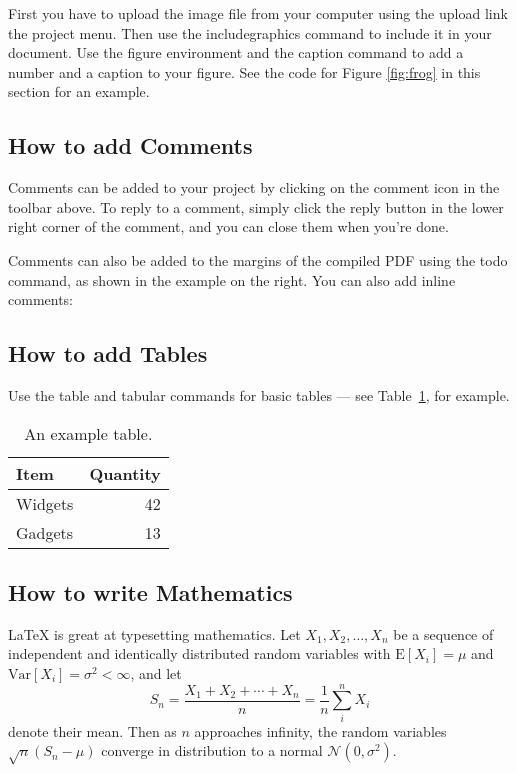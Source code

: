 First you have to upload the image file from your computer using the upload link the project menu. Then use the includegraphics command to include it in your document. Use the figure environment and the caption command to add a number and a caption to your figure. See the code for Figure \ref{fig:frog} in this section for an example.

\subsection{How to add Comments}

Comments can be added to your project by clicking on the comment icon in the toolbar above. %
%
%
To reply to a comment, simply click the reply button in the lower right corner of the comment, and you can close them when you're done.

Comments can also be added to the margins of the compiled PDF using the todo command, as shown in the example on the right. You can also add inline comments:


\subsection{How to add Tables}

Use the table and tabular commands for basic tables --- see Table~\ref{tab:widgets}, for example. 

\begin{table}
\centering
\begin{tabular}{l|r}
Item & Quantity \\\hline
Widgets & 42 \\
Gadgets & 13
\end{tabular}
\caption{\label{tab:widgets}An example table.}
\end{table}

\subsection{How to write Mathematics}

\LaTeX{} is great at typesetting mathematics. Let $X_1, X_2, \ldots, X_n$ be a sequence of independent and identically distributed random variables with $\text{E}[X_i] = \mu$ and $\text{Var}[X_i] = \sigma^2 < \infty$, and let
\[S_n = \frac{X_1 + X_2 + \cdots + X_n}{n}
      = \frac{1}{n}\sum_{i}^{n} X_i\]
denote their mean. Then as $n$ approaches infinity, the random variables $\sqrt{n}(S_n - \mu)$ converge in distribution to a normal $\mathcal{N}(0, \sigma^2)$.


